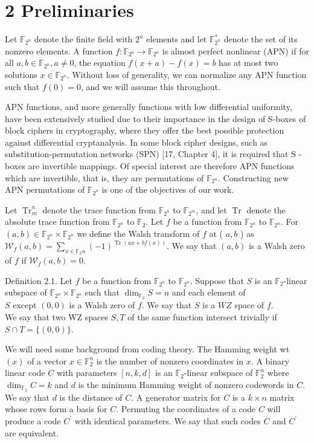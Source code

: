 \documentclass[10pt]{article}
\begin{document}
\section*{2 Preliminaries}
Let $\mathbb{F}_{2^{n}}$ denote the finite field with $2^{n}$ elements and let $\mathbb{F}_{2^{n}}^{*}$ denote the set of its nonzero elements. A function $f: \mathbb{F}_{2^{n}} \rightarrow \mathbb{F}_{2^{n}}$ is almost perfect nonlinear (APN) if for all $a, b \in \mathbb{F}_{2^{n}}, a \neq 0$, the equation $f(x+a)-f(x)=b$ has at most two solutions $x \in \mathbb{F}_{2^{n}}$. Without loss of generality, we can normalize any APN function such that $f(0)=0$, and we will assume this throughout.

APN functions, and more generally functions with low differential uniformity, have been extensively studied due to their importance in the design of S-boxes of block ciphers in cryptography, where they offer the best possible protection against differential cryptanalysis. In some block cipher designs, such as substitution-permutation networks (SPN) [17, Chapter 4], it is required that S -boxes are invertible mappings. Of special interest are therefore APN functions which are invertible, that is, they are permutations of $\mathbb{F}_{2^{n}}$. Constructing new APN permutations of $\mathbb{F}_{2^{n}}$ is one of the objectives of our work.

Let $\operatorname{Tr}_{m}^{n}$ denote the trace function from $\mathbb{F}_{2^{n}}$ to $\mathbb{F}_{2^{m}}$, and let $\operatorname{Tr}$ denote the absolute trace function from $\mathbb{F}_{2^{n}}$ to $\mathbb{F}_{2}$. Let $f$ be a function from $\mathbb{F}_{2^{n}}$ to $\mathbb{F}_{2^{n}}$. For $(a, b) \in \mathbb{F}_{2^{n}} \times \mathbb{F}_{2^{n}}$ we define the Walsh transform of $f$ at ( $a, b$ ) as $\mathcal{W}_{f}(a, b)=\sum_{x \in \mathbb{F}_{2} n}(-1)^{\operatorname{Tr}(a x+b f(x))}$. We say that $(a, b)$ is a Walsh zero of $f$ if $\mathcal{W}_{f}(a, b)=0$.

Definition 2.1. Let $f$ be a function from $\mathbb{F}_{2^{n}}$ to $\mathbb{F}_{2^{n}}$. Suppose that $S$ is an $\mathbb{F}_{2}$-linear subspace of $\mathbb{F}_{2^{n}} \times \mathbb{F}_{2^{n}}$ such that $\operatorname{dim}_{\mathbb{F}_{2}} S=n$ and each element of\\
$S$ except $(0,0)$ is a Walsh zero of $f$. We say that $S$ is a $W Z$ space of $f$.\\
We say that two WZ spaces $S, T$ of the same function intersect trivially if $S \cap T=\{(0,0)\}$.

We will need some background from coding theory. The Hamming weight wt $(x)$ of a vector $x \in \mathbb{F}_{2}^{n}$ is the number of nonzero coordinates in $x$. A binary linear code $C$ with parameters $[n, k, d]$ is an $\mathbb{F}_{2}$-linear subspace of $\mathbb{F}_{2}^{n}$ where $\operatorname{dim}_{\mathbb{F}_{2}} C=k$ and $d$ is the minimum Hamming weight of nonzero codewords in $C$. We say that $d$ is the distance of $C$. A generator matrix for $C$ is a $k \times n$ matrix whose rows form a basis for $C$. Permuting the coordinates of a code $C$ will produce a code $C^{\prime}$ with identical parameters. We say that such codes $C$ and $C^{\prime}$ are equivalent.
\end{document}
